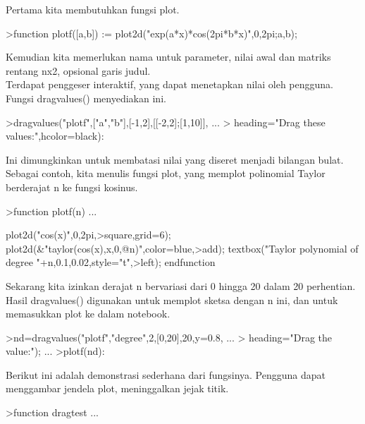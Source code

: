 \documentclass{article}
\begin{document}
\begin{eulernotebook}
\begin{eulercomment}
\begin{eulercomment}
\begin{eulercomment}
\begin{eulercomment}
\begin{eulercomment}
Pertama kita membutuhkan fungsi plot.
\end{eulercomment}
\begin{eulerprompt}
>function plotf([a,b]) := plot2d("exp(a*x)*cos(2pi*b*x)",0,2pi;a,b);
\end{eulerprompt}
\begin{eulercomment}
Kemudian kita memerlukan nama untuk parameter, nilai awal dan matriks
rentang nx2, opsional garis judul.\\
Terdapat penggeser interaktif, yang dapat menetapkan nilai oleh
pengguna. Fungsi dragvalues() menyediakan ini.
\end{eulercomment}
\begin{eulerprompt}
>dragvalues("plotf",["a","b"],[-1,2],[[-2,2];[1,10]], ...
>  heading="Drag these values:",hcolor=black):
\end{eulerprompt}
\begin{eulercomment}
Ini dimungkinkan untuk membatasi nilai yang diseret menjadi bilangan
bulat. Sebagai contoh, kita menulis fungsi plot, yang memplot
polinomial Taylor berderajat n ke fungsi kosinus.
\end{eulercomment}
\begin{eulerprompt}
>function plotf(n) ...
\end{eulerprompt}
\begin{eulerudf}
  plot2d("cos(x)",0,2pi,>square,grid=6);
  plot2d(&"taylor(cos(x),x,0,@n)",color=blue,>add);
  textbox("Taylor polynomial of degree "+n,0.1,0.02,style="t",>left);
  endfunction
\end{eulerudf}
\begin{eulercomment}
Sekarang kita izinkan derajat n bervariasi dari 0 hingga 20 dalam 20
perhentian. Hasil dragvalues() digunakan untuk memplot sketsa dengan n
ini, dan untuk memasukkan plot ke dalam notebook.
\end{eulercomment}
\begin{eulerprompt}
>nd=dragvalues("plotf","degree",2,[0,20],20,y=0.8, ...
>   heading="Drag the value:"); ...
>plotf(nd):
\end{eulerprompt}
\begin{eulercomment}
Berikut ini adalah demonstrasi sederhana dari fungsinya. Pengguna
dapat menggambar jendela plot, meninggalkan jejak titik.
\end{eulercomment}
\begin{eulerprompt}
>function dragtest ...
\end{eulerprompt}

\end{eulercomment}
\end{eulercomment}
\end{eulercomment}
\end{eulercomment}
\end{eulernotebook}
\end{document}
